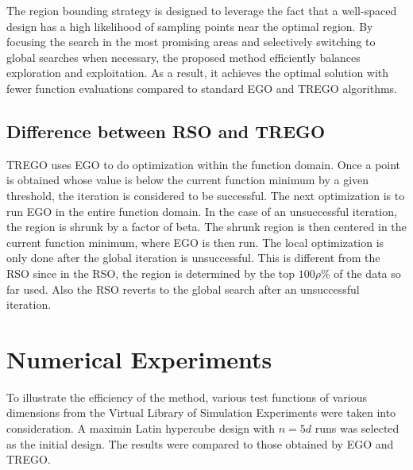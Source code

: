 \documentclass [PhD] {package/uclathes}
\begin{document}
The region bounding strategy is designed to leverage the fact that a well-spaced design has a high likelihood of sampling points near the optimal region. By focusing the search in the most promising areas and selectively switching to global searches when necessary, the proposed method efficiently balances exploration and exploitation. As a result, it achieves the optimal solution with fewer function evaluations compared to standard EGO and TREGO algorithms.

\subsection{Difference between RSO and TREGO}
TREGO uses EGO to do optimization within the function domain. Once a point is obtained whose value is below the current function minimum by a given threshold, the iteration is considered to be successful. The next optimization is to run EGO  in the entire function domain. In the case of an unsuccessful iteration, the region is shrunk by a factor of beta. The shrunk region is then centered in the current function minimum, where EGO is then run. The local optimization is only done after the global iteration is unsuccessful. This is different from the RSO since in the RSO, the region is determined by the top $100\rho\%$ of the data so far used. Also the RSO reverts to the global search after an unsuccessful iteration.


\section{Numerical Experiments}
To illustrate the efficiency of the method, various test functions of various dimensions from the Virtual Library of Simulation Experiments \parencite{simulationlib} were taken into consideration. A maximin Latin hypercube design with $n=5d$ runs was selected as the initial design. The results were compared to those obtained by EGO and TREGO.
\end{document}
